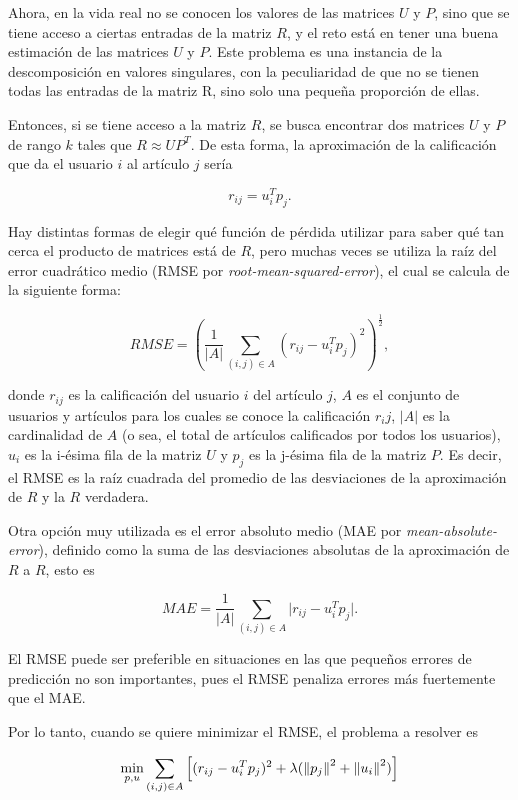 Ahora, en la vida real no se conocen los valores de las matrices $U$ y $P$, sino que se tiene acceso a ciertas entradas de la matriz $R$, y el reto está en tener una buena estimación de las matrices $U$ y $P$. Este problema es una instancia de la descomposición en valores singulares, con la peculiaridad de que no se tienen todas las entradas de la matriz R, sino solo una pequeña proporción de ellas.

Entonces, si se tiene acceso a la matriz $R$, se busca encontrar dos matrices $U$ y $P$ de rango $k$ tales que $R \approx U P^T$. De esta forma, la aproximación de la calificación que da el usuario $i$ al artículo $j$ sería

\begin{equation}\label{ec_fact_basico}
r_{ij} = u_i^T p_j.
\end{equation}


Hay distintas formas de elegir qué función de pérdida utilizar para saber qué tan cerca el producto de matrices está de $R$, pero muchas veces se utiliza la raíz del error cuadrático medio (RMSE por \textit{root-mean-squared-error}), el cual se calcula de la siguiente forma:

\[
RMSE = \left ( \frac{1}{\vert A \vert} \sum_{(i,j) \in A} (r_{ij} - u_i^Tp_j )^2 \right ) ^ \frac{1}{2},
\]

donde $r_{ij}$ es la calificación del usuario $i$ del artículo $j$, $A$ es el conjunto de usuarios y artículos para los cuales se conoce la calificación $r_ij$, $ \vert A \vert$ es la cardinalidad de $A$ (o sea, el total de artículos calificados por todos los usuarios), $u_i$ es la i-ésima fila de la matriz $U$ y $p_j$ es la j-ésima fila de la matriz $P$. Es decir, el RMSE es la raíz cuadrada del promedio de las desviaciones de la aproximación de $R$ y la $R$ verdadera. 

Otra opción muy utilizada es el error absoluto medio (MAE por \textit{mean-absolute-error}), definido como la suma de las desviaciones absolutas de la aproximación de $R$ a $R$, esto es

\[
MAE = \frac{1}{\vert A \vert} \sum_{(i,j) \in A} \vert r_{ij} - u_i^Tp_j \vert.
\]

El RMSE puede ser preferible en situaciones en las que pequeños errores de predicción no son importantes, pues el RMSE penaliza errores más fuertemente que el MAE.

Por lo tanto, cuando se quiere minimizar el RMSE, el problema a resolver es

\begin{equation}
\min_{p, u} \sum_{(i,j) \in A} \left [ (r_{ij} - u_i^Tp_j )^2 + \lambda ( \left\lVert p_j \right\rVert^2 + \left\lVert u_i \right\rVert^2 ) \right ]
\end{equation}

